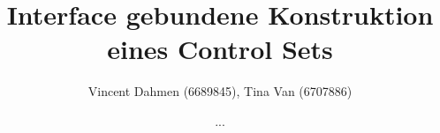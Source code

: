 \documentclass{article}
\begin{document}
\title{Interface gebundene Konstruktion eines Control Sets}
\date{...}
\author{Vincent Dahmen (6689845), Tina Van (6707886)}
\end{document}

